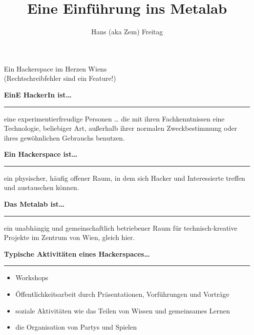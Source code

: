 \documentclass{seminar}
\title{Eine Einführung ins Metalab}
\author{ Hans (aka Zem) Freitag }
\providecommand{\T}[1]{
	\begin{center}
		{\bf #1}
	\end{center}
	\vspace{2mm}
	\hrule
	\vspace{2mm}
}
\begin{document}
\pagestyle{empty}
\centerslidestrue
\begin{slide}
	\maketitle
	\begin{center}
		Ein Hackerspace im Herzen Wiens\\
		{\sf (Rechtschreibfehler sind ein Feature!)}
	\end{center}
\end{slide}
\centerslidesfalse

\pagestyle{mypagestyle}

\begin{slide}
	\T{EinE HackerIn ist\ldots}
	eine experimentierfreudige Personen \ldots \pause
	die mit ihren Fachkenntnissen eine Technologie, beliebiger Art, außerhalb ihrer 
   normalen Zweckbestimmung oder ihres gewöhnlichen Gebrauchs benutzen.
\end{slide}

\begin{slide}
	\T{Ein Hackerspace ist\ldots}
	ein physischer, häufig offener Raum, in dem sich Hacker und Interessierte treffen 
	und austauschen können. \\ 
\end{slide}

\begin{slide}
	\T{Das Metalab ist\ldots}
	ein unabhängig und gemeinschaftlich betriebener Raum für technisch-kreative 
	Projekte im Zentrum von Wien, gleich hier.
\end{slide}

\begin{slide}
	\T{Typische Aktivitäten eines Hackerspaces\ldots}
	\begin{itemize}
		\item Workshops \pause
		\item Öffentlichkeitsarbeit durch Präsentationen, Vorführungen und Vorträge \pause
		\item soziale Aktivitäten wie das Teilen von Wissen und gemeinsames Lernen \pause
		\item die Organisation von Partys und Spielen \pause
	\end{itemize}
\end{slide}
\end{document}
